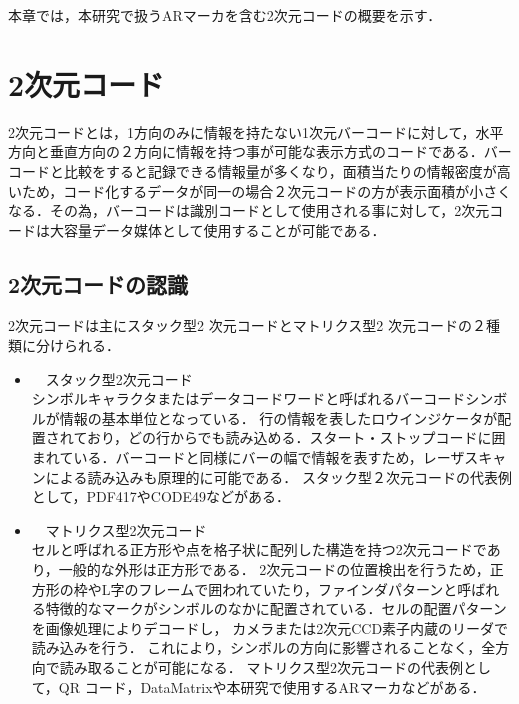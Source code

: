 
本章では，本研究で扱うARマーカを含む2次元コードの概要を示す．

\section{2次元コード}

2次元コードとは，1方向のみに情報を持たない1次元バーコードに対して，水平方向と垂直方向の２方向に情報を持つ事が可能な表示方式のコードである．バーコードと比較をすると記録できる情報量が多くなり，面積当たりの情報密度が高いため，コード化するデータが同一の場合２次元コードの方が表示面積が小さくなる．その為，バーコードは識別コードとして使用される事に対して，2次元コードは大容量データ媒体として使用することが可能である．




\subsection{2次元コードの認識}
2次元コードは主にスタック型2 次元コードとマトリクス型2 次元コードの２種類に分けられる．

\begin{itemize}
\item　スタック型2次元コード　\\
シンボルキャラクタまたはデータコードワードと呼ばれるバーコードシンボルが情報の基本単位となっている．
行の情報を表したロウインジケータが配置されており，どの行からでも読み込める．スタート・ストップコードに囲まれている．バーコードと同様にバーの幅で情報を表すため，レーザスキャンによる読み込みも原理的に可能である．
スタック型２次元コードの代表例として，PDF417やCODE49などがある．
\end{itemize}

\begin{itemize}
\item　マトリクス型2次元コード \\
セルと呼ばれる正方形や点を格子状に配列した構造を持つ2次元コードであり，一般的な外形は正方形である．
2次元コードの位置検出を行うため，正方形の枠やL字のフレームで囲われていたり，ファインダパターンと呼ばれる特徴的なマークがシンボルのなかに配置されている．セルの配置パターンを画像処理によりデコードし，
カメラまたは2次元CCD素子内蔵のリーダで読み込みを行う．
これにより，シンボルの方向に影響されることなく，全方向で読み取ることが可能になる．
マトリクス型2次元コードの代表例として，QR コード，DataMatrixや本研究で使用するARマーカなどがある．
\end{itemize}





